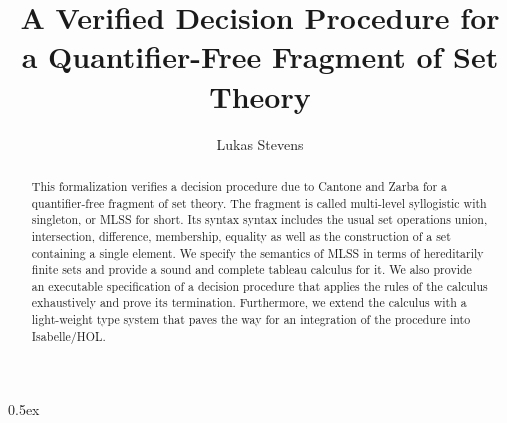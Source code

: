 \documentclass[11pt,a4paper]{article}
\begin{document}
\title{A Verified Decision Procedure for a Quantifier-Free Fragment of Set Theory}
\author{Lukas Stevens}
\maketitle

\begin{abstract}
  This formalization verifies a decision procedure due to Cantone and Zarba for a quantifier-free fragment of set theory.
  The fragment is called multi-level syllogistic with singleton, or MLSS for short.
  Its syntax syntax includes the usual set operations union, intersection, difference, membership, equality as well as the construction of a set containing a single element.
  We specify the semantics of MLSS in terms of hereditarily finite sets and provide a sound and complete tableau calculus for it. 
  We also provide an executable specification of a decision procedure that applies the rules of the calculus exhaustively and prove its termination.
  Furthermore, we extend the calculus with a light-weight type system that paves the way for an integration of the procedure into Isabelle/HOL.
\end{abstract}

\tableofcontents

\parindent 0pt\parskip 0.5ex



\nocite{*}


\end{document}
